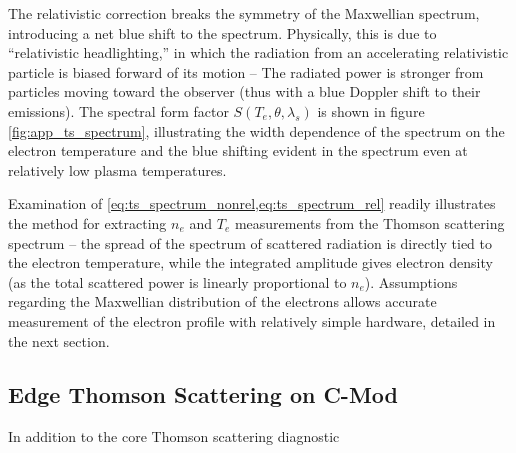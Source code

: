 \noindent The relativistic correction breaks the symmetry of the Maxwellian spectrum, introducing a net blue shift to the spectrum.  Physically, this is due to ``relativistic headlighting,'' in which the radiation from an accelerating relativistic particle is biased forward of its motion -- The radiated power is stronger from particles moving toward the observer (thus with a blue Doppler shift to their emissions).  The spectral form factor $S(T_e,\theta,\lambda_s)$ is shown in figure \cref{fig:app_ts_spectrum}, illustrating the width dependence of the spectrum on the electron temperature and the blue shifting evident in the spectrum even at relatively low plasma temperatures.

Examination of \cref{eq:ts_spectrum_nonrel,eq:ts_spectrum_rel} readily illustrates the method for extracting $n_e$ and $T_e$ measurements from the Thomson scattering spectrum -- the spread of the spectrum of scattered radiation is directly tied to the electron temperature, while the integrated amplitude gives electron density (as the total scattered power is linearly proportional to $n_e$).  Assumptions regarding the Maxwellian distribution of the electrons allows accurate measurement of the electron profile with relatively simple hardware, detailed in the next section.

\subsection{Edge Thomson Scattering on C-Mod}\label{subsec:app_ts_cmod}

In addition to the core Thomson scattering diagnostic \cite{Watterson1990,Mossessian1999}

